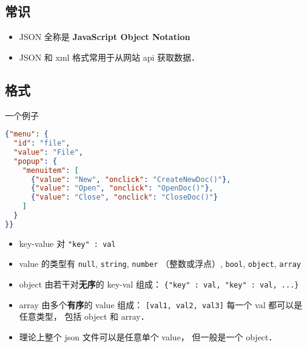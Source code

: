 
\begin{issues}
\issueDraft
\end{issues}

\subsection{常识}
\begin{itemize}
\item JSON 全称是 \textbf{JavaScript Object Notation}
\item JSON 和 xml 格式常用于从网站 api 获取数据．
\end{itemize}

\subsection{格式}
一个例子
\begin{lstlisting}[language=json]
{"menu": {
  "id": "file",
  "value": "File",
  "popup": {
    "menuitem": [
      {"value": "New", "onclick": "CreateNewDoc()"},
      {"value": "Open", "onclick": "OpenDoc()"},
      {"value": "Close", "onclick": "CloseDoc()"}
    ]
  }
}}
\end{lstlisting}

\begin{itemize}
\item key-value 对 \verb|"key" : val|
\item value 的类型有 \verb|null|, \verb|string|, \verb|number| （整数或浮点）, \verb|bool|, \verb|object|, \verb|array|
\item object 由若干对\textbf{无序}的 key-val 组成： \verb|{"key" : val, "key" : val, ...}|
\item array 由多个\textbf{有序}的 value 组成： \verb|[val1, val2, val3]| 每一个 val 都可以是任意类型， 包括 object 和 array．
\item 理论上整个 json 文件可以是任意单个 value， 但一般是一个 object．
\end{itemize}
